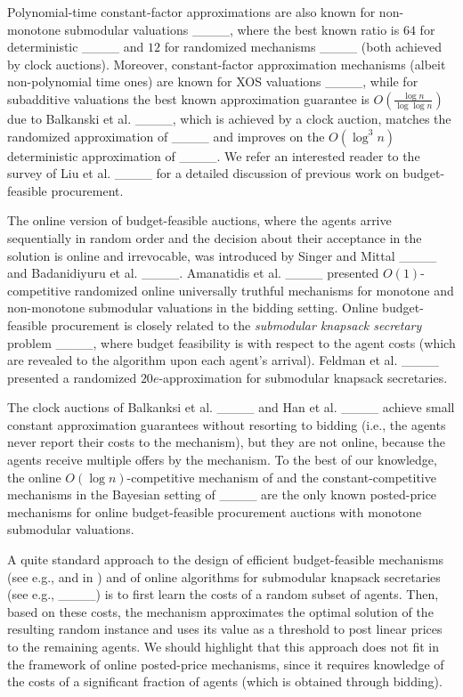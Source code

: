 Polynomial-time constant-factor approximations are also known for non-monotone submodular valuations ____, where the best known ratio is $64$ for deterministic  ____ and $12$ for randomized mechanisms ____ (both achieved by clock auctions). Moreover, constant-factor approximation mechanisms (albeit non-polynomial time ones) are known for XOS valuations ____, while for subadditive valuations the best known approximation guarantee is $O(\frac{\log n}{\log\log n})$ due to Balkanski et al. ____, which is achieved by a clock auction, matches the randomized approximation of ____ and improves on the $O(\log^3 n)$ deterministic approximation of ____. We refer an interested reader to the survey of Liu et al. ____ for a detailed discussion of previous work on budget-feasible procurement. 

The online version of budget-feasible auctions, where the agents arrive sequentially in random order and the decision about their acceptance in the solution is online and irrevocable, was introduced by Singer and Mittal ____ and Badanidiyuru et al. ____. %
Amanatidis et al. ____ presented $O(1)$-competitive randomized online universally truthful mechanisms for monotone and non-monotone submodular valuations in the bidding setting. Online budget-feasible procurement is closely related to the \emph{submodular knapsack secretary} problem ____, where budget feasibility is with respect to the agent costs (which are revealed to the algorithm upon each agent's arrival). Feldman et al. ____ presented a randomized $20e$-approximation for submodular knapsack secretaries.



The clock auctions of Balkanksi et al. ____ and Han et al. ____ achieve small constant approximation guarantees without resorting to  bidding (i.e., the agents never report their costs to the mechanism), but
they are not online, because the agents receive multiple offers by the mechanism. To the best of our knowledge, the online $O(\log n)$-competitive mechanism of \cite[Section~4]{Bada2012} and the constant-competitive mechanisms in the Bayesian setting of 
____ are the only known posted-price mechanisms for online budget-feasible procurement auctions with monotone submodular valuations. 

A quite standard approach to the design of efficient budget-feasible mechanisms (see e.g., \cite[Section~5]{Bada2012} and in 
\cite[Section~4]{AmanatidisKS22}) and of online algorithms for submodular knapsack secretaries (see e.g., ____) is to first learn the costs of a random subset of agents. Then, based on these costs, the mechanism approximates the optimal solution of the resulting random instance and uses its value as a threshold to post linear prices to the remaining agents. We should highlight that this approach does not fit in the framework of online posted-price mechanisms, since it requires knowledge of the costs of a significant fraction of agents (which is obtained through bidding).
